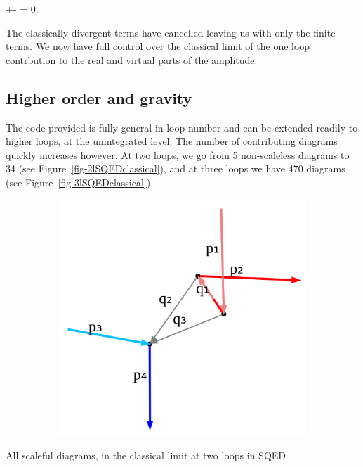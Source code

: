 \documentclass[
  11pt,
  a4paper,
  DIV=11,
  numbers=noendperiod,
  twoside]{scrreprt}
\let\[\relax \let\]\relax %
\DeclareRobustCommand{\[}{\begin{equation}}
\DeclareRobustCommand{\]}{\end{equation}}
\begin{document}
\[
\int \dn[4]{\bar{\ell}}+-  =  0.
\]

The classically divergent terms have cancelled leaving us with only the
finite terms. We now have full control over the classical limit of the
one loop contrbution to the real and virtual parts of the amplitude.

\hypertarget{higher-order-and-gravity}{%
\subsection{Higher order and gravity}\label{higher-order-and-gravity}}

The code provided is fully general in loop number and can be extended
readily to higher loops, at the unintegrated level. The number of
contributing diagrams quickly increases however. At two loops, we go
from 5 non-scaleless diagrams to 34 (see
Figure~\ref{fig-2lSQEDclassical}), and at three loops we have 470
diagrams (see Figure~\ref{fig-3lSQEDclassical}).

\hypertarget{fig-2lSQEDclassical}{}
{
\makeatletter
\def\LT@makecaption#1#2#3{%
  \noalign{\smash{\hbox{\kern\textwidth\rlap{\kern\marginparsep
  \parbox[t]{\marginparwidth}{%
    \footnotesize{%
      \vspace{(1.1\baselineskip)}
    #1{#2: }\ignorespaces #3}}}}}}%
    }
\makeatother

\begin{figure}[H]

{\centering \includegraphics[width=8in,height=3.5in]{./scattering_files/figure-latex/dot-figure-4.png}

}

\end{figure}

\label{fig-2lSQEDclassical}All scaleful diagrams, in the classical limit
at two loops in SQED

}
\end{document}
